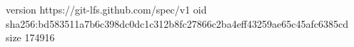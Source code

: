 version https://git-lfs.github.com/spec/v1
oid sha256:bd583511a7b6c398dc0dc1c312b8fc27866c2ba4eff43259ae65c45afc6385cd
size 174916
